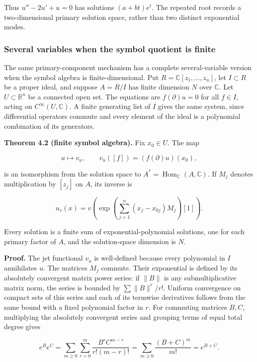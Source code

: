 \documentclass[
]{article}
\begin{document}
Thus \(u''-2u'+u=0\) has solutions \((a+bt)e^t\). The repeated root
records a two-dimensional primary solution space, rather than two
distinct exponential modes.

\subsubsection{Several variables when the symbol quotient is
finite}\label{several-variables-when-the-symbol-quotient-is-finite}

The same primary-component mechanism has a complete several-variable
version when the symbol algebra is finite-dimensional. Put
\(R=\mathbb C[z_1,\ldots,z_n]\), let \(I\subset R\) be a proper ideal,
and suppose \(A=R/I\) has finite dimension \(N\) over \(\mathbb C\). Let
\(U\subset\mathbb R^n\) be a connected open set. The equations are
\(f(\partial)u=0\) for all \(f\in I\), acting on
\(C^\infty(U,\mathbb C)\). A finite generating list of \(I\) gives the
same system, since differential operators commute and every element of
the ideal is a polynomial combination of its generators.

\textbf{Theorem 4.2 (finite symbol algebra).} Fix \(x_0\in U\). The map

\[
u\longmapsto v_u,\qquad v_u([f])=(f(\partial)u)(x_0),
\]

is an isomorphism from the solution space to
\(A^*=\operatorname{Hom}_{\mathbb C}(A,\mathbb C)\). If \(M_j\) denotes
multiplication by \([z_j]\) on \(A\), its inverse is

\[
u_v(x)=v\left(\exp\left(\sum_{j=1}^n(x_j-x_{0j})M_j\right)[1]\right).       \tag{2}
\]

Every solution is a finite sum of exponential-polynomial solutions, one
for each primary factor of \(A\), and the solution-space dimension is
\(N\).

\textbf{Proof.} The jet functional \(v_u\) is well-defined because every
polynomial in \(I\) annihilates \(u\). The matrices \(M_j\) commute.
Their exponential is defined by its absolutely convergent matrix power
series: if \(\|B\|\) is any submultiplicative matrix norm, the series is
bounded by \(\sum\|B\|^r/r!\). Uniform convergence on compact sets of
this series and each of its termwise derivatives follows from the same
bound with a fixed polynomial factor in \(r\). For commuting matrices
\(B,C\), multiplying the absolutely convergent series and grouping terms
of equal total degree gives

\[
e^B e^C
=\sum_{m\ge0}\sum_{r=0}^{m}\frac{B^rC^{m-r}}{r!(m-r)!}
=\sum_{m\ge0}\frac{(B+C)^m}{m!}=e^{B+C}.
\]
\end{document}
